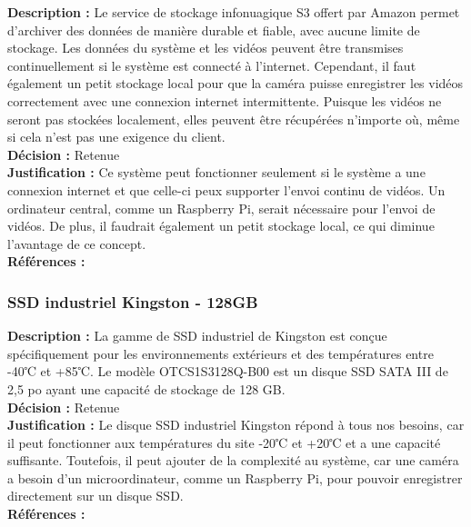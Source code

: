 \noindent
\textbf{Description :} Le service de stockage infonuagique S3 offert par Amazon permet
d'archiver des données de manière durable et fiable, avec aucune limite de
stockage. Les données du système et les vidéos peuvent être transmises
continuellement si le système est connecté à l'internet. Cependant, il faut
également un petit stockage local pour que la caméra puisse enregistrer les
vidéos correctement avec une connexion internet intermittente. Puisque les
vidéos ne seront pas stockées localement, elles peuvent être récupérées
n'importe où, même si cela n'est pas une exigence du client. \\

\noindent
\textbf{Décision :} Retenue \\

\noindent
\textbf{Justification :} Ce système peut fonctionner seulement si le système a une
connexion internet et que celle-ci peux supporter l'envoi continu de vidéos. Un
ordinateur central, comme un Raspberry Pi, serait nécessaire pour l’envoi de
vidéos. De plus, il faudrait également un petit stockage local, ce qui diminue
l'avantage de ce concept. \\

\noindent
\textbf{Références :} \cite{34} \\

\subsubsection{SSD industriel Kingston - 128GB}

\noindent
\textbf{Description :} La gamme de SSD industriel de Kingston est conçue spécifiquement
pour les environnements extérieurs et des températures entre -40℃ et +85℃. Le
modèle OTCS1S3128Q-B00 est un disque SSD SATA III de 2,5 po ayant une capacité
de stockage de 128 GB. \\

\noindent
\textbf{Décision :} Retenue \\

\noindent
\textbf{Justification :} Le disque SSD industriel Kingston répond à tous nos besoins, car il peut fonctionner aux
températures du site -20℃ et +20℃ et a une capacité suffisante. Toutefois, il
peut ajouter de la complexité au système, car une caméra a besoin d’un
microordinateur, comme un Raspberry Pi, pour pouvoir enregistrer directement
sur un disque SSD. \\

\noindent
\textbf{Références :} \cite{24} \\


